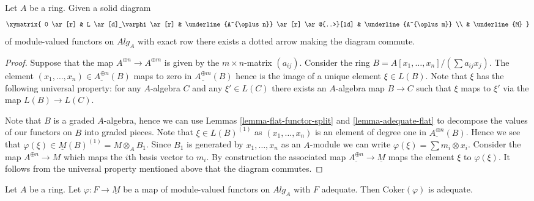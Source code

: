 \begin{lemma}
\label{lemma-lift-map}
Let $A$ be a ring. Given a solid diagram
$$
\xymatrix{
0 \ar[r] &
L \ar[d]_\varphi \ar[r] &
\underline{A^{\oplus n}} \ar[r] \ar@{..>}[ld] &
\underline{A^{\oplus m}} \\
& \underline{M}
}
$$
of module-valued functors on $\textit{Alg}_A$
with exact row there exists a dotted arrow making the diagram commute.
\end{lemma}

\begin{proof}
Suppose that the map $A^{\oplus n} \to A^{\oplus m}$ is given by the
$m \times n$-matrix $(a_{ij})$. Consider the ring
$B = A[x_1, \ldots, x_n]/(\sum a_{ij}x_j)$. The element
$(x_1, \ldots, x_n) \in \underline{A^{\oplus n}}(B)$ maps to zero in
$\underline{A^{\oplus m}}(B)$ hence is the image of a unique element
$\xi \in L(B)$. Note that $\xi$ has the following universal property:
for any $A$-algebra $C$ and any $\xi' \in L(C)$ there exists an $A$-algebra
map $B \to C$ such that $\xi$ maps to $\xi'$ via the map $L(B) \to L(C)$.

\medskip\noindent
Note that $B$ is a graded $A$-algebra, hence we can use
Lemmas \ref{lemma-flat-functor-split} and \ref{lemma-adequate-flat}
to decompose the values of our functors on $B$ into graded pieces.
Note that $\xi \in L(B)^{(1)}$ as $(x_1, \ldots, x_n)$ is an element
of degree one in $\underline{A^{\oplus n}}(B)$. Hence we see that
$\varphi(\xi) \in \underline{M}(B)^{(1)} = M \otimes_A B_1$.
Since $B_1$ is generated by $x_1, \ldots, x_n$ as an $A$-module we
can write $\varphi(\xi) = \sum m_i \otimes x_i$. Consider the map
$A^{\oplus n} \to M$ which maps the $i$th basis vector to $m_i$.
By construction the associated map
$\underline{A^{\oplus n}} \to \underline{M}$
maps the element $\xi$ to $\varphi(\xi)$. It follows from the
universal property mentioned above that the diagram commutes.
\end{proof}

\begin{lemma}
\label{lemma-cokernel-into-module}
Let $A$ be a ring.
Let $\varphi : F \to \underline{M}$ be a map of module-valued functors
on $\textit{Alg}_A$ with $F$ adequate.
Then $\text{Coker}(\varphi)$ is adequate.
\end{lemma}

